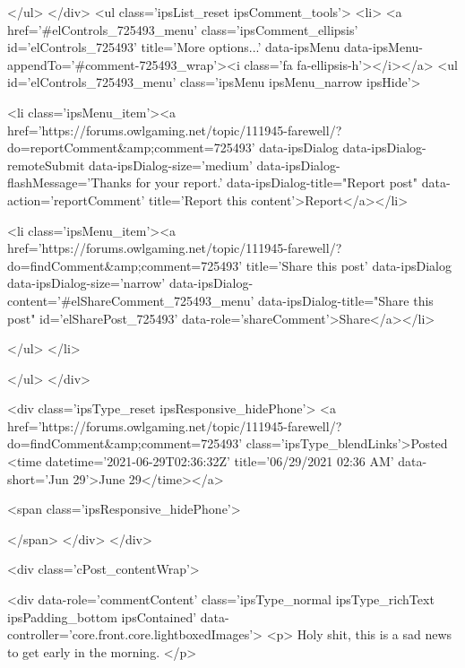 				</ul>
			</div>
			<ul class='ipsList_reset ipsComment_tools'>
				<li>
					<a href='#elControls_725493_menu' class='ipsComment_ellipsis' id='elControls_725493' title='More options...' data-ipsMenu data-ipsMenu-appendTo='#comment-725493_wrap'><i class='fa fa-ellipsis-h'></i></a>
					<ul id='elControls_725493_menu' class='ipsMenu ipsMenu_narrow ipsHide'>
						
							<li class='ipsMenu_item'><a href='https://forums.owlgaming.net/topic/111945-farewell/?do=reportComment&amp;comment=725493' data-ipsDialog data-ipsDialog-remoteSubmit data-ipsDialog-size='medium' data-ipsDialog-flashMessage='Thanks for your report.' data-ipsDialog-title="Report post" data-action='reportComment' title='Report this content'>Report</a></li>
						
						
							<li class='ipsMenu_item'><a href='https://forums.owlgaming.net/topic/111945-farewell/?do=findComment&amp;comment=725493' title='Share this post' data-ipsDialog data-ipsDialog-size='narrow' data-ipsDialog-content='#elShareComment_725493_menu' data-ipsDialog-title="Share this post" id='elSharePost_725493' data-role='shareComment'>Share</a></li>
						
                        
						
						
						
							
								
							
							
							
							
							
							
						
					</ul>
				</li>
				
			</ul>
		</div>

		<div class='ipsType_reset ipsResponsive_hidePhone'>
			<a href='https://forums.owlgaming.net/topic/111945-farewell/?do=findComment&amp;comment=725493' class='ipsType_blendLinks'>Posted <time datetime='2021-06-29T02:36:32Z' title='06/29/2021 02:36  AM' data-short='Jun 29'>June 29</time></a> 
			
			<span class='ipsResponsive_hidePhone'>
				
				
			</span>
		</div>
	</div>

	

    

	<div class='cPost_contentWrap'>
		
		<div data-role='commentContent' class='ipsType_normal ipsType_richText ipsPadding_bottom ipsContained' data-controller='core.front.core.lightboxedImages'>
			<p>
	Holy shit, this is a sad news to get early in the morning.
</p>

